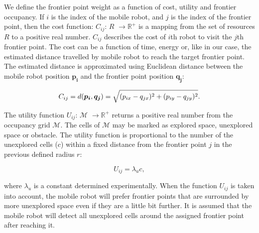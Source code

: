 We define the frontier point weight as a function of cost, utility and frontier occupancy. If $i$ is the index of the mobile robot, and $j$ is the index of the frontier point, then the cost function: $C_{ij}$: $R$ \(\rightarrow \text{$\mathbb{R}^{+}$}\) is a mapping from the set of resources $R$ to a positive real number. $C_{ij}$ describes the cost of $i$th robot to visit the $j$th frontier point. The cost can be a function of time, energy or, like in our case, the estimated distance travelled by mobile robot to reach the target frontier point. The estimated distance is approximated using Euclidean distance between the mobile robot position $\boldsymbol{p_{i}}$ and the frontier point position $\boldsymbol{q_{j}}$:

\begin{equation}\small
    C_{ij}=d(\boldsymbol{p_{i}}, \boldsymbol{q_{j}}) = \sqrt{(p_{ix}-q_{jx})^{2}+(p_{iy}-q_{jy})^{2}}.
    \label{cost}
\end{equation}

The utility function $U_{ij}$:  \(\text{$\mathcal {M}$}\) \(\rightarrow \text{$\mathbb{R}^{+}$}\) returns a positive real number from the occupancy grid \(\text{$\mathcal {M}$}\). The cells of \(\text{$\mathcal {M}$}\) may be marked as explored space, unexplored space or obstacle. The utility function is proportional to the number of the unexplored cells ($c$) within a fixed distance from the frontier point $j$ in the previous defined radius $r$: 

\begin{equation}
    U_{ij} = \lambda_{u}c,
\end{equation}

where $\lambda_{u}$ is a constant determined experimentally. When the function $U_{ij}$ is taken into account, the mobile robot will prefer frontier points that are surrounded by more unexplored space even if they are a little bit further. 
It is assumed that the mobile robot will detect all unexplored cells around the assigned frontier point after reaching it. 


